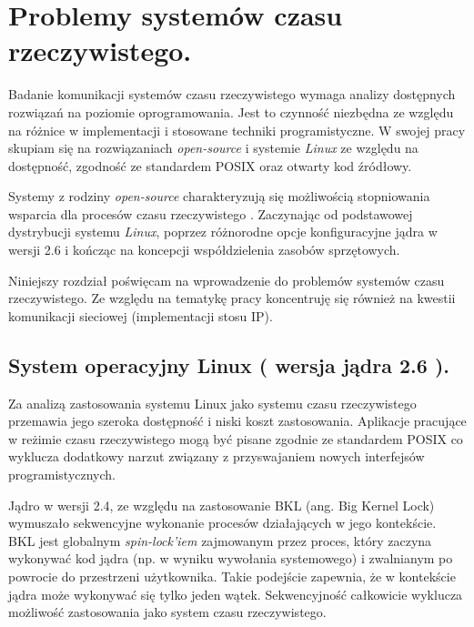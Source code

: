 
\section{Problemy systemów czasu rzeczywistego.}

Badanie komunikacji systemów czasu rzeczywistego wymaga analizy dostępnych rozwiązań na poziomie oprogramowania. Jest to czynność niezbędna ze względu na różnice w implementacji i stosowane techniki programistyczne. W swojej pracy skupiam się na rozwiązaniach \emph{open-source} i systemie \emph{Linux} ze względu na dostępność, zgodność ze standardem POSIX oraz otwarty kod źródłowy.

Systemy z rodziny \emph{open-source} charakteryzują się możliwością stopniowania wsparcia dla procesów czasu rzeczywistego \cite{wiki:RTLinux}. Zaczynając od podstawowej dystrybucji systemu \emph{Linux}, poprzez różnorodne opcje konfiguracyjne jądra w wersji 2.6 i kończąc na koncepcji współdzielenia zasobów sprzętowych. 

Niniejszy rozdział poświęcam na wprowadzenie do problemów systemów czasu rzeczywistego. Ze względu na tematykę pracy koncentruję się również na kwestii komunikacji sieciowej (implementacji stosu IP). 

\subsection{System operacyjny Linux ( wersja jądra 2.6 ).}

Za analizą zastosowania systemu Linux jako systemu czasu rzeczywistego przemawia jego szeroka dostępność i niski koszt zastosowania. Aplikacje pracujące w reżimie czasu rzeczywistego mogą być pisane zgodnie ze standardem POSIX co wyklucza dodatkowy narzut związany z przyswajaniem nowych interfejsów programistycznych. 

Jądro w wersji 2.4, ze względu na zastosowanie BKL (ang. Big Kernel Lock) wymuszało sekwencyjne wykonanie procesów działających w jego kontekście. BKL jest globalnym \emph{spin-lock'iem} zajmowanym przez proces, który zaczyna wykonywać kod jądra (np. w wyniku wywołania systemowego) i zwalnianym po powrocie do przestrzeni użytkownika. Takie podejście zapewnia, że w kontekście jądra może wykonywać się tylko jeden wątek. Sekwencyjność całkowicie wyklucza możliwość zastosowania jako system czasu rzeczywistego. 

